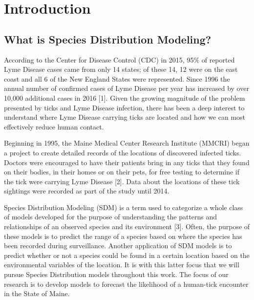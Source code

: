 
\chapter{Introduction} %

\label{Chapter1} %


\newcommand{\keyword}[1]{\textbf{#1}}
\newcommand{\tabhead}[1]{\textbf{#1}}
\newcommand{\code}[1]{\texttt{#1}}
\newcommand{\file}[1]{\texttt{\bfseries#1}}
\newcommand{\option}[1]{\texttt{\itshape#1}}



\section{What is Species Distribution Modeling?}
According to the Center for Disease Control (CDC) in 2015, 95\% of reported Lyme Disease cases came from only 14 states; of these 14, 12 were on the east coast and all 6 of the New England States were represented. Since 1996 the annual number of confirmed cases of Lyme Disease per year has increased by over 10,000 additional cases in 2016 [1]. Given the growing magnitude of the problem presented by ticks and Lyme Disease infection, there has been a deep interest to understand where Lyme Disease carrying ticks are located and how we can most effectively reduce human contact. \newline

\noindent Beginning in 1995, the Maine Medical Center Research Institute (MMCRI) began a project to create detailed records of the locations of discovered infected ticks. Doctors were encouraged to have their patients bring in any ticks that they found on their bodies, in their homes or on their pets, for free testing to determine if the tick were carrying Lyme Disease [2]. Data about the locations of these tick sightings were recorded as part of the study until 2014. \newline

\noindent Species Distribution Modeling (SDM) is a term used to categorize a whole class of models developed for the purpose of understanding the patterns and relationships of an observed species and its environment [3]. Often, the purpose of these models is to predict the range of a species based on where the species has been recorded during surveillance. Another application of SDM models is to predict whether or not a species could be found in a certain location based on the environmental variables of the location. It is with this latter focus that we will pursue Species Distribution models throughout this work. The focus of our research is to develop models to forecast the likelihood of a human-tick encounter in the State of Maine.  \newline

